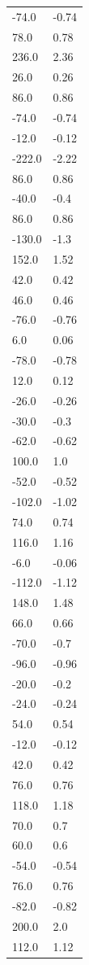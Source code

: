 \begin{longtable}{ll}
-74.0 & -0.74 \\
78.0 & 0.78 \\
236.0 & 2.36 \\
26.0 & 0.26 \\
86.0 & 0.86 \\
-74.0 & -0.74 \\
-12.0 & -0.12 \\
-222.0 & -2.22 \\
86.0 & 0.86 \\
-40.0 & -0.4 \\
86.0 & 0.86 \\
-130.0 & -1.3 \\
152.0 & 1.52 \\
42.0 & 0.42 \\
46.0 & 0.46 \\
-76.0 & -0.76 \\
6.0 & 0.06 \\
-78.0 & -0.78 \\
12.0 & 0.12 \\
-26.0 & -0.26 \\
-30.0 & -0.3 \\
-62.0 & -0.62 \\
100.0 & 1.0 \\
-52.0 & -0.52 \\
-102.0 & -1.02 \\
74.0 & 0.74 \\
116.0 & 1.16 \\
-6.0 & -0.06 \\
-112.0 & -1.12 \\
148.0 & 1.48 \\
66.0 & 0.66 \\
-70.0 & -0.7 \\
-96.0 & -0.96 \\
-20.0 & -0.2 \\
-24.0 & -0.24 \\
54.0 & 0.54 \\
-12.0 & -0.12 \\
42.0 & 0.42 \\
76.0 & 0.76 \\
118.0 & 1.18 \\
70.0 & 0.7 \\
60.0 & 0.6 \\
-54.0 & -0.54 \\
76.0 & 0.76 \\
-82.0 & -0.82 \\
200.0 & 2.0 \\
112.0 & 1.12 \\

\end{longtable}
